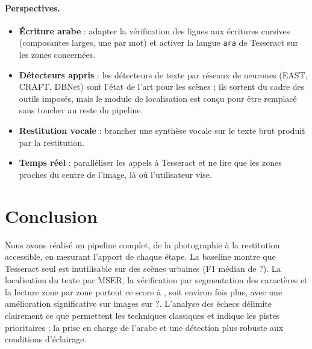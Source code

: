 \documentclass[11pt,a4paper]{article}
\newcommand{\nbImages}{?}\newcommand{\configFinale}{?}\newcommand{\baseFmed}{?}%
\begin{document}
\paragraph{Perspectives.}
\begin{itemize}
\item \textbf{Écriture arabe} : adapter la vérification des lignes aux écritures cursives (composantes larges, une par mot) et activer la langue \texttt{ara} de Tesseract sur les zones concernées.
\item \textbf{Détecteurs appris} : les détecteurs de texte par réseaux de neurones (EAST, CRAFT, DBNet) sont l'état de l'art pour les scènes ; ils sortent du cadre des outils imposés, mais le module de localisation est conçu pour être remplacé sans toucher au reste du pipeline.
\item \textbf{Restitution vocale} : brancher une synthèse vocale sur le texte brut produit par la restitution.
\item \textbf{Temps réel} : paralléliser les appels à Tesseract et ne lire que les zones proches du centre de l'image, là où l'utilisateur vise.
\end{itemize}

\section{Conclusion}
Nous avons réalisé un pipeline complet, de la photographie à la restitution accessible, en mesurant l'apport de chaque étape. La baseline montre que Tesseract seul est inutilisable sur des scènes urbaines (F1 médian de \baseFmed). La localisation du texte par MSER, la vérification par segmentation des caractères et la lecture zone par zone portent ce score à \finFmed{}, soit environ \facteurF{} fois plus, avec une amélioration significative sur \finMieux{} images sur \nbImages. L'analyse des échecs délimite clairement ce que permettent les techniques classiques et indique les pistes prioritaires : la prise en charge de l'arabe et une détection plus robuste aux conditions d'éclairage.

\appendix
\end{document}
